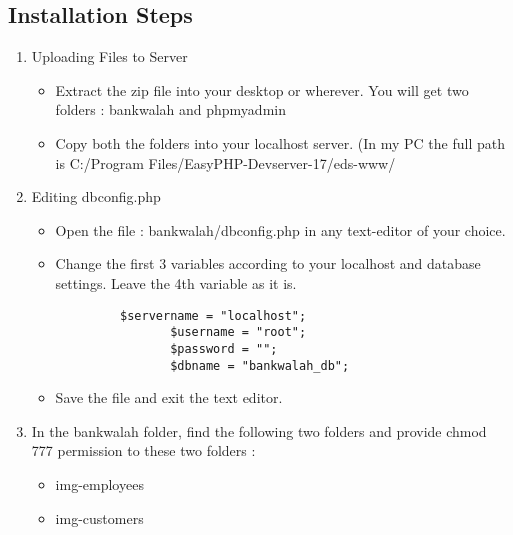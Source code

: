 \documentclass{article}
\begin{document}
\subsection{Installation Steps}
\begin{enumerate}
\item Uploading Files to Server
  \begin{itemize}
 \item Extract the zip file into your desktop or wherever. You will get two folders : bankwalah and phpmyadmin
 \item Copy both the folders into your localhost server. (In my PC the full path is C:/Program Files/EasyPHP-Devserver-17/eds-www/
  \end{itemize}


\item Editing dbconfig.php
  \begin{itemize}
 \item Open the file : bankwalah/dbconfig.php in any text-editor of your choice.
 \item Change the first 3 variables according to your localhost and database settings. Leave the 4th variable as it is.
    \begin{verbatim}
         $servername = "localhost";
	        	$username = "root";
	        	$password = "";
	        	$dbname = "bankwalah_db";
	\end{verbatim}
 \item Save the file and exit the text editor.
  \end{itemize}
  
  
  
 \item In the bankwalah folder, find the following two folders and provide chmod 777 permission to these two folders :
    \begin{itemize}
    \item img-employees
    \item img-customers
    \end{itemize}
 

\end{enumerate}
\end{document}
